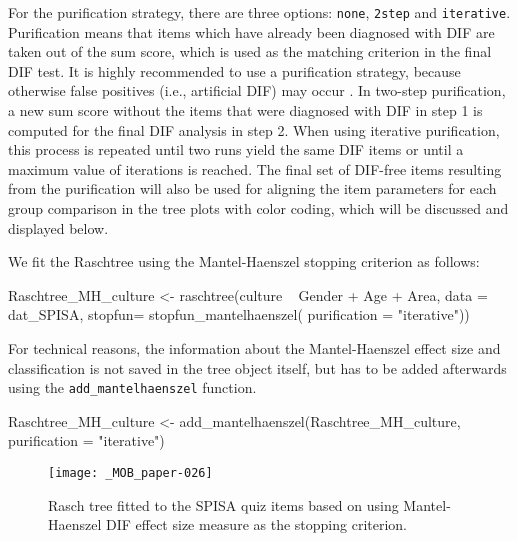 \documentclass[doc,floatsintext,natbib]{apa7}
\begin{document}
For the purification strategy, there are three options: \texttt{none}, \texttt{2step} and \texttt{iterative}. Purification means that items which have already been diagnosed with DIF are taken out of the sum score, which is used as the matching criterion in the final DIF test. It is highly recommended to use a purification strategy, because otherwise false positives (i.e., artificial DIF) may occur \citep[cf., e.g.,][and the references therein]{DebStrZei:2022:CRC,HennyDeba23,Kopfetal:2015:EPM}. In two-step purification, a new sum score without the items that were diagnosed with DIF in step 1 is computed for the final DIF analysis in step 2. When using iterative purification, this process is repeated until two runs yield the same DIF items or until a maximum value of iterations is reached. 
The final set of DIF-free items resulting from the purification will also be used for aligning the item parameters for each group comparison in the tree plots with color coding, which will be discussed and displayed below.

We fit the Raschtree using the Mantel-Haenszel stopping criterion as follows:


\begin{Schunk}
\begin{Sinput}
 Raschtree_MH_culture <- raschtree(culture ~  Gender + Age + Area,
                                   data = dat_SPISA,
                                   stopfun= stopfun_mantelhaenszel(
                                     purification = "iterative"))
\end{Sinput}
\end{Schunk}

For technical reasons, the information about the Mantel-Haenszel effect size and classification is not saved in the tree object itself, but has to be added afterwards using the \texttt{add\_mantelhaenszel} function.

\begin{Schunk}
\begin{Sinput}
 Raschtree_MH_culture <- add_mantelhaenszel(Raschtree_MH_culture,
                                            purification = "iterative")
\end{Sinput}
\end{Schunk}



\begin{figure}%
\caption{Rasch tree fitted to the SPISA quiz items based on using Mantel-Haenszel DIF effect size measure as the stopping criterion.}
\texttt{[image: \_MOB\_paper-026]}
\label{fig:MHtree2}
\end{figure}%
\end{document}
